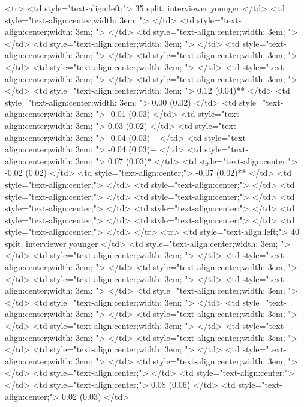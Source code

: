   <tr>
   <td style="text-align:left;"> 35 split, interviewer younger </td>
   <td style="text-align:center;width: 3em; ">  </td>
   <td style="text-align:center;width: 3em; ">  </td>
   <td style="text-align:center;width: 3em; ">  </td>
   <td style="text-align:center;width: 3em; ">  </td>
   <td style="text-align:center;width: 3em; ">  </td>
   <td style="text-align:center;width: 3em; ">  </td>
   <td style="text-align:center;width: 3em; ">  </td>
   <td style="text-align:center;width: 3em; ">  </td>
   <td style="text-align:center;width: 3em; ">  </td>
   <td style="text-align:center;width: 3em; "> 0.12 (0.04)** </td>
   <td style="text-align:center;width: 3em; "> 0.00 (0.02) </td>
   <td style="text-align:center;width: 3em; "> -0.01 (0.03) </td>
   <td style="text-align:center;width: 3em; "> 0.03 (0.02) </td>
   <td style="text-align:center;width: 3em; "> -0.04 (0.03)+ </td>
   <td style="text-align:center;width: 3em; "> -0.04 (0.03)+ </td>
   <td style="text-align:center;width: 3em; "> 0.07 (0.03)* </td>
   <td style="text-align:center;"> -0.02 (0.02) </td>
   <td style="text-align:center;"> -0.07 (0.02)** </td>
   <td style="text-align:center;">  </td>
   <td style="text-align:center;">  </td>
   <td style="text-align:center;">  </td>
   <td style="text-align:center;">  </td>
   <td style="text-align:center;">  </td>
   <td style="text-align:center;">  </td>
   <td style="text-align:center;">  </td>
   <td style="text-align:center;">  </td>
   <td style="text-align:center;">  </td>
  </tr>
  <tr>
   <td style="text-align:left;"> 40 split, interviewer younger </td>
   <td style="text-align:center;width: 3em; ">  </td>
   <td style="text-align:center;width: 3em; ">  </td>
   <td style="text-align:center;width: 3em; ">  </td>
   <td style="text-align:center;width: 3em; ">  </td>
   <td style="text-align:center;width: 3em; ">  </td>
   <td style="text-align:center;width: 3em; ">  </td>
   <td style="text-align:center;width: 3em; ">  </td>
   <td style="text-align:center;width: 3em; ">  </td>
   <td style="text-align:center;width: 3em; ">  </td>
   <td style="text-align:center;width: 3em; ">  </td>
   <td style="text-align:center;width: 3em; ">  </td>
   <td style="text-align:center;width: 3em; ">  </td>
   <td style="text-align:center;width: 3em; ">  </td>
   <td style="text-align:center;width: 3em; ">  </td>
   <td style="text-align:center;width: 3em; ">  </td>
   <td style="text-align:center;width: 3em; ">  </td>
   <td style="text-align:center;">  </td>
   <td style="text-align:center;">  </td>
   <td style="text-align:center;"> 0.08 (0.06) </td>
   <td style="text-align:center;"> 0.02 (0.03) </td>
